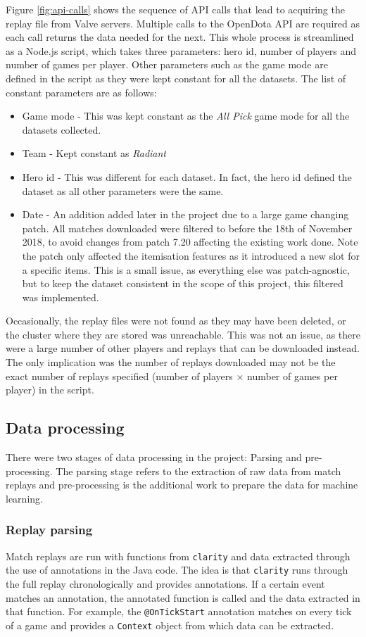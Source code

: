 \documentclass[Report.tex]{subfiles}
\begin{document}
Figure \ref{fig:api-calls} shows the sequence of API calls that lead to acquiring the replay file from Valve servers. Multiple calls to the OpenDota API are required as each call returns the data needed for the next. This whole process is streamlined as a Node.js script, which takes three parameters: hero id, number of players and number of games per player. Other parameters such as the game mode are defined in the script as they were kept constant for all the datasets. The list of constant parameters are as follows:
\begin{itemize}
\item Game mode - This was kept constant as the \textit{All Pick} game mode for all the datasets collected.
\item Team - Kept constant as \textit{Radiant}
\item Hero id - This was different for each dataset. In fact, the hero id defined the dataset as all other parameters were the same. 
\item Date - An addition added later in the project due to a large game changing patch. All matches downloaded were filtered to before the 18th of November 2018, to avoid changes from patch 7.20 affecting the existing work done. Note the patch only affected the itemisation features as it introduced a new slot for a specific items. This is a small issue, as everything else was patch-agnostic, but to keep the dataset consistent in the scope of this project, this filtered was implemented. 
\end{itemize}
Occasionally, the replay files were not found as they may have been deleted, or the cluster where they are stored was unreachable. This was not an issue, as there were a large number of other players and replays that can be downloaded instead. The only implication was the number of replays downloaded may not be the exact number of replays specified (number of players $\times$ number of games per player) in the script. 

\subsection{Data processing}
There were two stages of data processing in the project: Parsing and pre-processing. The parsing stage refers to the extraction of raw data from match replays and pre-processing is the additional work to prepare the data for machine learning. 
\subsubsection{Replay parsing}
Match replays are run with functions from \texttt{clarity} and data extracted through the use of annotations in the Java code. The idea is that \texttt{clarity} runs through the full replay chronologically and provides annotations. If a certain event matches an annotation, the annotated function is called and the data extracted in that function. For example, the \texttt{@OnTickStart} annotation matches on every tick of a game and provides a \texttt{Context} object from which data can be extracted. 
\end{document}
